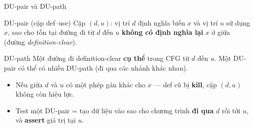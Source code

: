 \documentclass[aspectratio=169,12pt]{beamer}
\begin{document}
\begin{frame}{DU-pair và DU-path}
  \begin{block}{DU-pair (cặp def--use)}
    Cặp $(d, u)$: vị trí $d$ định nghĩa biến $x$ và vị trí $u$ sử dụng
    $x$, sao cho tồn tại đường đi từ $d$ đến $u$ \textbf{không có
    định nghĩa lại} $x$ ở giữa (đường \textit{definition-clear}).
  \end{block}

  \vspace{0.3em}
  \begin{block}{DU-path}
    Một đường đi definition-clear \textbf{cụ thể} trong CFG
    từ $d$ đến $u$. Một DU-pair có thể có nhiều DU-path
    (đi qua các nhánh khác nhau).
  \end{block}

  \vspace{0.3em}
  \begin{itemize}
    \item Nếu giữa $d$ và $u$ có một phép gán khác cho $x$ ---
          def cũ bị \textbf{kill}, cặp $(d,u)$ không còn hiệu lực.
    \item Test một DU-pair = tạo dữ liệu vào sao cho chương trình
          \textbf{đi qua} $d$ rồi tới $u$, và \textbf{assert} giá trị tại $u$.
  \end{itemize}
\end{frame}
\end{document}
